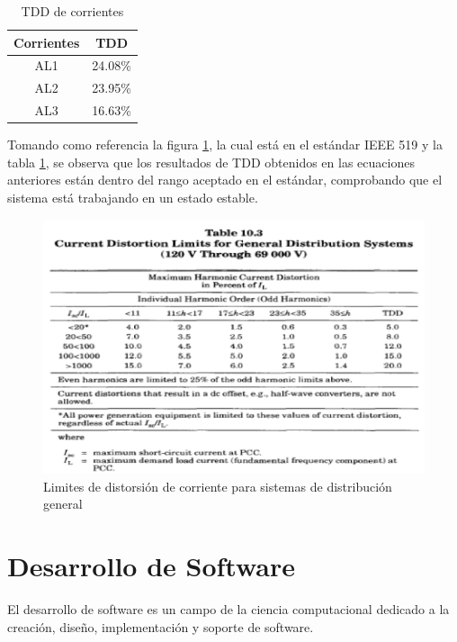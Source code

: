 \begin{table}[!htbp]
\begin{center}
\begin{tabular}{ |c|c| } 
\hline
Corrientes & TDD\\
\hline
AL1 & 24.08\%\\
\hline
AL2 & 23.95\%\\
\hline
AL3 & 16.63\%\\
\hline
\end{tabular}
\end{center}
\caption{TDD de corrientes}
\label{tab:tdd-corriente}
\end{table}

Tomando como referencia la figura \ref{fig:limites-corriente}, la cual está en el estándar IEEE 519 y la tabla \ref{tab:tdd-corriente}, se observa que los resultados de TDD obtenidos en las ecuaciones anteriores están dentro del rango aceptado en el estándar, comprobando que el sistema está trabajando en un estado estable. 

\begin{figure}[H]
\centering
\includegraphics{2Marco/limites-distorsion-corriente}
\caption{Limites de distorsión de corriente para sistemas de distribución general} 
\label{fig:limites-corriente}
\end{figure} 

\section{Desarrollo de Software}

El desarrollo de software es un campo de la ciencia computacional dedicado a la creación, diseño, implementación y soporte de software.

